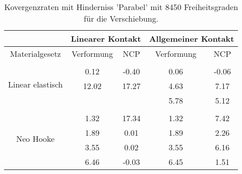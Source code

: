 \begin{table} 
\centering 
\begin{tabular}{c|cc|cc|} 
\cline{2-5} 
 & \multicolumn{2}{|c|}{Linearer Kontakt} & \multicolumn{2}{|c|}{Allgemeiner Kontakt} \\ 
\hline 
\multicolumn{1}{|c|}{Materialgesetz} & \multicolumn{1}{c|}{Verformung} & \multicolumn{1}{c|}{NCP} & \multicolumn{1}{c|}{Verformung} & \multicolumn{1}{c|}{NCP} \\ 
\hline 
\multicolumn{1}{|c|}{\multirow{4}{*}{Linear elastisch}} &\multicolumn{1}{|c|}{} & \multicolumn{1}{|c|}{} & \multicolumn{1}{|c|}{} & \multicolumn{1}{|c|}{} \\ 
\multicolumn{1}{|c|}{} & \multicolumn{1}{|c|}{      0.12} & \multicolumn{1}{|c|}{     -0.40} & \multicolumn{1}{|c|}{      0.06} & \multicolumn{1}{|c|}{     -0.06} \\ 
\multicolumn{1}{|c|}{} & \multicolumn{1}{|c|}{     12.02} & \multicolumn{1}{|c|}{     17.27} & \multicolumn{1}{|c|}{      4.63} & \multicolumn{1}{|c|}{      7.17} \\ 
\multicolumn{1}{|c|}{} & \multicolumn{1}{|c|}{} & \multicolumn{1}{|c|}{} & \multicolumn{1}{|c|}{      5.78} & \multicolumn{1}{|c|}{      5.12} \\ 
\hline 
\multicolumn{1}{|c|}{\multirow{5}{*}{Neo Hooke}} &\multicolumn{1}{|c|}{} & \multicolumn{1}{|c|}{} & \multicolumn{1}{|c|}{} & \multicolumn{1}{|c|}{} \\ 
\multicolumn{1}{|c|}{} & \multicolumn{1}{|c|}{      1.32} & \multicolumn{1}{|c|}{     17.34} & \multicolumn{1}{|c|}{      1.32} & \multicolumn{1}{|c|}{      7.42} \\ 
\multicolumn{1}{|c|}{} & \multicolumn{1}{|c|}{      1.89} & \multicolumn{1}{|c|}{      0.01} & \multicolumn{1}{|c|}{      1.89} & \multicolumn{1}{|c|}{      2.26} \\ 
\multicolumn{1}{|c|}{} & \multicolumn{1}{|c|}{      3.55} & \multicolumn{1}{|c|}{      0.02} & \multicolumn{1}{|c|}{      3.55} & \multicolumn{1}{|c|}{      6.16} \\ 
\multicolumn{1}{|c|}{} & \multicolumn{1}{|c|}{      6.46} & \multicolumn{1}{|c|}{     -0.03} & \multicolumn{1}{|c|}{      6.45} & \multicolumn{1}{|c|}{      1.51} \\ 
\hline 
\end{tabular}\caption{Kovergenzraten mit Hinderniss 'Parabel' mit 8450 Freiheitsgraden für die Verschiebung.}\label{tab:Rate_Parabel_level5}
\end{table} 
